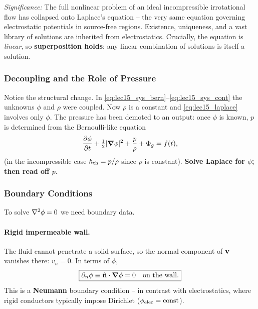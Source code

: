 \documentclass[../main.tex]{subfiles}
\begin{document}
\textit{Significance:} The full nonlinear problem of an ideal incompressible irrotational flow has collapsed onto Laplace's equation -- the very same equation governing electrostatic potentials in source-free regions. Existence, uniqueness, and a vast library of solutions are inherited from electrostatics. Crucially, the equation is \emph{linear}, so \textbf{superposition holds}: any linear combination of solutions is itself a solution.

\subsubsection{Decoupling and the Role of Pressure}

Notice the structural change. In \eqref{eq:lec15_sys_bern}--\eqref{eq:lec15_sys_cont} the unknowns $\phi$ and $\rho$ were coupled. Now $\rho$ is a constant and \eqref{eq:lec15_laplace} involves only $\phi$. The pressure has been demoted to an output: once $\phi$ is known, $p$ is determined from the Bernoulli-like equation
\begin{equation}
  \pdv{\phi}{t} + \tfrac{1}{2}|\grad\phi|^2 + \frac{p}{\rho} + \Phi_g = f(t),
  \label{eq:lec15_pressure_out}
\end{equation}
(in the incompressible case $h_{\rm th}=p/\rho$ since $\rho$ is constant). \textbf{Solve Laplace for $\phi$; then read off $p$.}


\subsubsection{Boundary Conditions}

To solve $\nabla^2\phi=0$ we need boundary data.

\paragraph{Rigid impermeable wall.}
The fluid cannot penetrate a solid surface, so the normal component of $\mathbf{v}$ vanishes there: $v_n=0$. In terms of $\phi$,
\begin{equation}
  \boxed{\partial_n\phi \equiv \hat{\mathbf{n}}\cdot\grad\phi = 0 \quad\text{on the wall.}}
  \label{eq:lec15_bc_wall}
\end{equation}
This is a \textbf{Neumann} boundary condition -- in contrast with electrostatics, where rigid conductors typically impose Dirichlet ($\phi_{\rm elec}=\mathrm{const}$).
\end{document}
